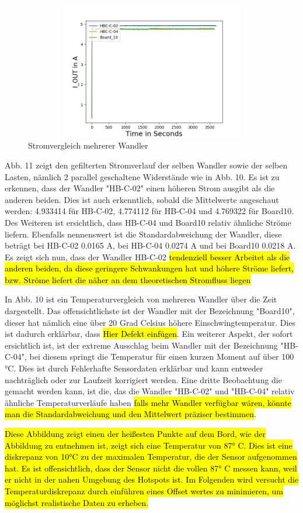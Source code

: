 \begin{figure}
    \centering
    \includegraphics[height= 6cm, width = 12cm]{Pictures/Comp_IOUT.png}
    \caption{Stromvergleich mehrerer Wandler}
\end{figure}

\begin{flushleft}



Abb. 11 zeigt den gefilterten Stromverlauf der selben Wandler sowie der selben Lasten, nämlich 2 parallel geschaltene Widerstände wie in Abb. 10. Es ist zu erkennen, dass der Wandler "HB-C-02" einen höheren Strom ausgibt als die anderen beiden. Dies ist auch erkenntlich, sobald die Mittelwerte angeschaut werden: 4.933414 für HB-C-02, 4.774112 für HB-C-04 und 4.769322 für Board10. Des Weiteren ist ersichtlich, dass HB-C-04 und Board10 relativ ähnliche Ströme liefern. Ebenfalls nennenswert ist die Standardabweichung der Wandler, diese beträgt bei HB-C-02 0.0165 A, bei HB-C-04 0.0274 A und bei Board10 0.0218 A. Es zeigt sich nun, dass der Wandler HB-C-02 \hl{tendenziell besser Arbeitet als die anderen beiden, da diese geringere Schwankungen hat und höhere Ströme liefert, bzw. Ströme liefert die näher an dem theoretischen Stromfluss liegen}

In Abb. 10 ist ein Temperaturvergleich von mehreren Wandler über die Zeit dargestellt. Das offensichtlichste ist der Wandler mit der Bezeichnung "Board10", dieser hat nämlich eine über 20 Grad Celsius höhere Einschwingtemperatur. Dies ist dadurch erklärbar, dass \hl{Hier Defekt einfügen}. Ein weiterer Aspekt, der sofort ersichtlich ist, ist der extreme Ausschlag beim Wandler mit der Bezeichnung "HB-C-04", bei diesem springt die Temperatur für einen kurzen Moment auf über 100 °C. Dies ist durch Fehlerhafte Sensordaten erklärbar und kann entweder nachträglich oder zur Laufzeit korrigiert werden. Eine dritte Beobachtung die gemacht werden kann, ist die, das die Wandler "HB-C-02" und "HB-C-04" relativ ähnliche Temperaturverläufe haben \hl{falls mehr Wandler verfügbar wären, könnte man die Standardabweichung und den Mittelwert präziser bestimmen}.

\hl{Diese Abbildung zeigt einen der heißesten Punkte auf dem Bord, wie der Abbildung zu entnehmen ist, zeigt sich eine Temperatur von 87° C. Dies ist eine diskrepanz von 10°C zu der maximalen Temperatur, die der Sensor aufgenommen hat. Es ist offensichtlich, dass der Sensor nicht die vollen 87° C messen kann, weil er nicht in der nahen Umgebung des Hotspots ist. Im Folgenden wird versucht die Temperaturdiskrepanz durch einführen eines Offset wertes zu minimieren, um möglichst realistische Daten zu erheben.}
\end{flushleft}
